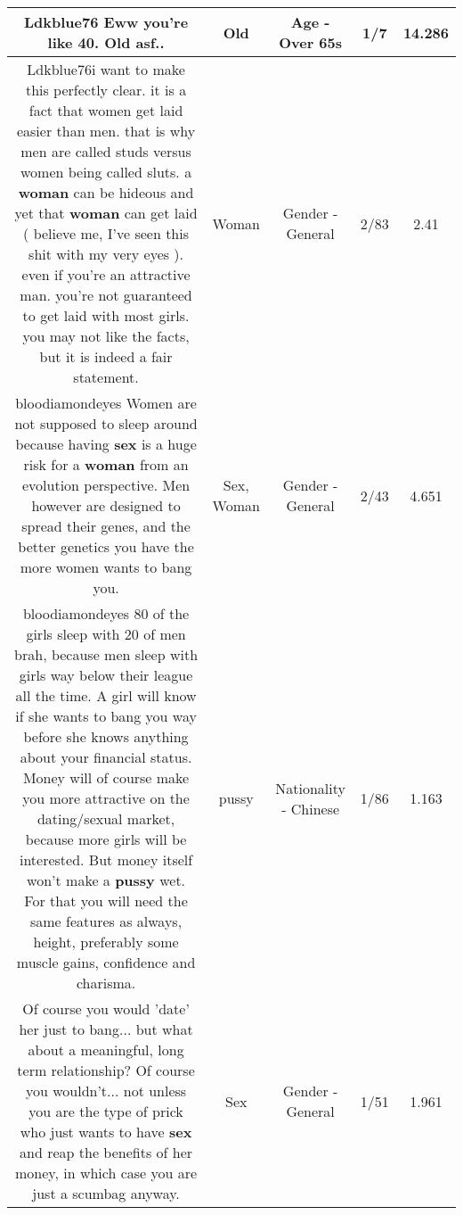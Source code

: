 \documentclass[11pt]{article}
\newlength\mylength
\begin{document}
\begin{center}
\begin{longtable}{|C{.65\mylength}|C{.30\mylength}|C{.12\mylength}|C{.12\mylength}|C{.12\mylength}|}
  \small Ldkblue76 Eww you're like 40. \textbf{Old} asf..\normalsize   & Old & Age - Over 65s & 1/7 & 14.286 \\  \hline
  \small Ldkblue76i want to make this perfectly clear. it is a fact that women get laid easier than men. that is why men are called studs versus women being called sluts. a \textbf{woman} can be hideous and yet that \textbf{woman} can get laid ( believe me, I've seen this shit with my very eyes ). even if you're an attractive man. you're not guaranteed to get laid with most girls. you may not like the facts, but it is indeed a fair statement.\normalsize   & Woman & Gender - General & 2/83 & 2.41 \\  \hline
  \small bloodiamondeyes Women are not supposed to sleep around because having \textbf{sex} is a huge risk for a \textbf{woman} from an evolution perspective. Men however are designed to spread their genes, and the better genetics you have the more women wants to bang you.\normalsize   & Sex, Woman & Gender - General & 2/43 & 4.651 \\  \hline
  \small bloodiamondeyes 80 of the girls sleep with 20 of men brah, because men sleep with girls way below their league all the time. A girl will know if she wants to bang you way before she knows anything about your financial status. Money will of course make you more attractive on the dating/sexual market, because more girls will be interested. But money itself won't make a \textbf{pussy} wet. For that you will need the same features as always, height, preferably some muscle gains, confidence and charisma.\normalsize   & pussy & Nationality - Chinese & 1/86 & 1.163 \\  \hline
  \small Of course you would 'date' her just to bang... but what about a meaningful, long term relationship?  Of course you wouldn't... not unless you are the type of prick who just wants to have \textbf{sex} and reap the benefits of her money, in which case you are just a scumbag anyway.\normalsize   & Sex & Gender - General & 1/51 & 1.961 \\  \hline

\end{longtable}
\end{center}
\end{document}
